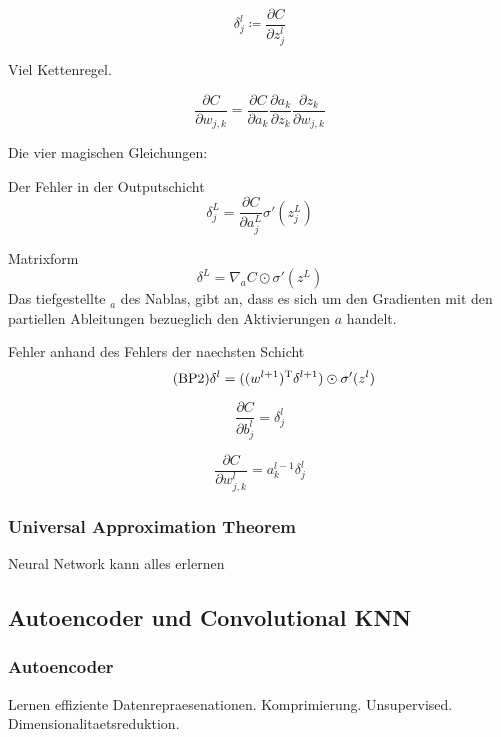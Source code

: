 \documentclass[../main]{subfiles}
\begin{document}
\begin{equation}
  \delta_j^l \coloneqq \frac{\partial C}{\partial z_j^l}
\end{equation}

Viel Kettenregel.

\begin{equation}
  \frac{\partial C}{\partial w_{j,k}} = \frac{\partial C}{\partial a_k} \frac{\partial a_k}{\partial z_k} \frac{\partial z_k}{\partial w_{j,k}}
\end{equation}

Die vier magischen Gleichungen:

Der Fehler in der Outputschicht
\begin{equation}\tag{BP1}
  \delta_j^L = \frac{\partial C}{\partial a_j^L} \sigma'(z_j^L)
\end{equation}

Matrixform
\begin{equation}\tag{BP1a}
  \delta^L = \nabla_aC \odot \sigma'(z^L)
\end{equation}
Das tiefgestellte $_a$ des Nablas, gibt an, dass es sich um den Gradienten mit den partiellen
Ableitungen bezueglich den Aktivierungen $a$ handelt.

Fehler anhand des Fehlers der naechsten Schicht
\begin{equation}\tag{BP2}
  \delta^l = ((w^{l+1})^\mathrm{T} \delta^{l+1}) \odot \sigma'(z^l)
\end{equation}

\begin{equation}\tag{BP3}
  \frac{\partial C}{\partial b_j^l} = \delta_j^l
\end{equation}

\begin{equation}\tag{BP4}
  \frac{\partial C}{\partial w_{j,k}^l} = a_k^{l-1} \delta_j^l
\end{equation}



\subsubsection{Universal Approximation Theorem}\label{sec:UAT}
Neural Network kann alles erlernen

\subsection{Autoencoder und Convolutional KNN}
\subsubsection{Autoencoder}
Lernen effiziente Datenrepraesenationen. Komprimierung. Unsupervised.
Dimensionalitaetsreduktion.
\end{document}
